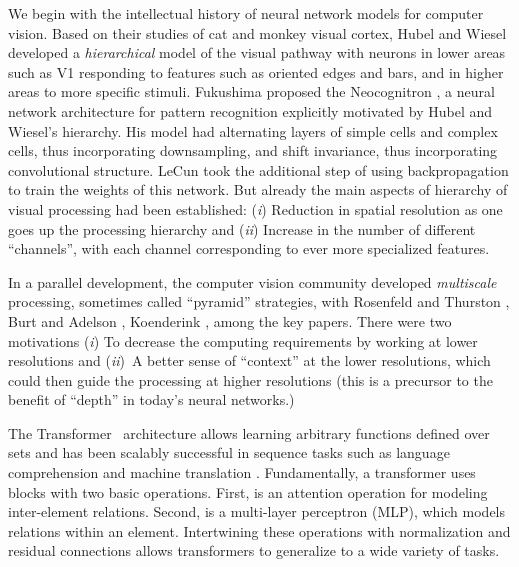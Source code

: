 \documentclass[10pt,twocolumn,letterpaper]{article}
\begin{document}
\label{sec:introduction}
We begin with the intellectual history of neural network models for computer vision. Based on their studies of cat and monkey visual cortex, Hubel and Wiesel \cite{hubel1960receptive} developed a \textit{hierarchical} model of the visual pathway with neurons in lower areas such as V1 responding to features such as oriented edges and bars, and in higher areas to more specific stimuli. Fukushima proposed the Neocognitron \cite{fukushima1982neocognitron}, a neural network architecture for pattern recognition explicitly motivated by Hubel and Wiesel’s hierarchy. His model had alternating layers of simple cells and complex cells, thus incorporating downsampling, and shift invariance, thus incorporating convolutional structure. LeCun \etal \cite{lecun1989backpropagation} took the additional step of using backpropagation to train the weights of this network. But already the main aspects of hierarchy of visual processing had been established: (\textit{i}) Reduction in spatial resolution as one goes up the processing hierarchy and (\textit{ii}) Increase in the number of different ``channels'', with each channel corresponding to ever more specialized features.

In a parallel development, the computer vision community developed \textit{multiscale} processing, sometimes called “pyramid” strategies, with Rosenfeld and Thurston \cite{rosenfeld1971edge}, Burt and Adelson \cite{burt1987laplacian}, Koenderink \cite{koenderink1984structure}, among the key papers. There were two motivations (\textit{i}) To decrease the computing requirements by working at lower resolutions and (\textit{ii})~A better sense of “context” at the lower resolutions, which could then guide the processing at higher resolutions (this is a precursor to the benefit of “depth” in today’s neural networks.)

The Transformer~\cite{vaswani2017attention} architecture 
allows learning arbitrary functions defined over sets and has been scalably successful in sequence tasks such as language comprehension \cite{edunov2018understanding} and machine translation \cite{brown2020language}. Fundamentally, a transformer uses blocks with two basic operations. First, is an attention operation \cite{bahdanau2014neural} for modeling inter-element relations. Second, is a multi-layer perceptron (MLP), which models relations within an element. Intertwining these operations with normalization \cite{ba2016layer} and residual connections \cite{He2015} 
allows transformers to generalize to a wide variety of tasks. 
\end{document}
